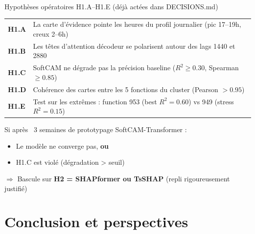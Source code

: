 \documentclass[10pt]{beamer}
\begin{document}
\begin{frame}{Hypothèses opératoires H1.A--H1.E (déjà actées dans DECISIONS.md)}
  \begin{tcolorbox}[colback=blue!3, colframe=blue!50!black, arc=2mm, fonttitle=\bfseries,
                    title={Cible H1 = Cluster 4 (5 fonctions, signal 24h)}]
    \footnotesize
    \begin{tabular}{p{0.5cm}p{10cm}}
      \toprule
      \textbf{H1.A} & La carte d'évidence pointe les heures du profil journalier (pic 17--19h, creux 2--6h) \\
      \textbf{H1.B} & Les têtes d'attention décodeur se polarisent autour des lags 1440 et 2880 \\
      \textbf{H1.C} & SoftCAM ne dégrade pas la précision baseline ($R^2 \geq 0.30$, Spearman $\geq 0.85$) \\
      \textbf{H1.D} & Cohérence des cartes entre les 5 fonctions du cluster (Pearson $> 0.95$) \\
      \textbf{H1.E} & Test sur les extrêmes : function 953 (best $R^2{=}0.60$) vs 949 (stress $R^2{=}0.15$) \\
      \bottomrule
    \end{tabular}
  \end{tcolorbox}

  \begin{tcolorbox}[colback=newcontrib!5, colframe=newcontrib!70!black, arc=2mm, fonttitle=\bfseries,
                    title=Critère de bascule vers H2]
    Si après ~3 semaines de prototypage SoftCAM-Transformer :
    \begin{itemize}
      \item Le modèle ne converge pas, \textbf{ou}
      \item H1.C est violé (dégradation > seuil)
    \end{itemize}
    \centering
    $\Rightarrow$ Bascule sur \textbf{H2 = SHAPformer ou TsSHAP} (repli rigoureusement justifié)
  \end{tcolorbox}
\end{frame}

\section{Conclusion et perspectives}
\end{document}
